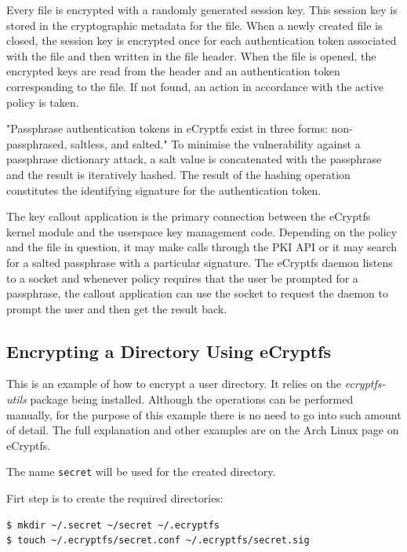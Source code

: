 Every file is encrypted with a randomly generated session key. This session key is stored in the cryptographic metadata for the file. When a newly created file is closed, the session key is encrypted once for each authentication token associated with the file and then written in the file header. When the file is opened, the encrypted keys are read from the header and an authentication token corresponding to the file. If not found, an action in accordance with the active policy is taken.

"Passphrase authentication tokens in eCryptfs exist in three forms: non-passphrased, saltless, and salted\cite{ecryptfs-paper}." To minimise the vulnerability against a passphrase dictionary attack, a salt value is concatenated with the passphrase and the result is iteratively hashed. The result of the hashing operation constitutes the identifying signature for the authentication token.

The key callout application is the primary connection between the eCryptfs kernel module and the userspace key management code. Depending on the policy and the file in question, it may make calls through the PKI API or it may search for a salted passphrase with a particular signature. The eCryptfs daemon listens to a socket and whenever policy requires that the user be prompted for a passphrase, the callout application can use the socket to request the daemon to prompt the user and then get the result back.

\subsection{Encrypting a Directory Using eCryptfs}
\label{sub-sec:encrypt-dir-ecryptfs}

This is an example of how to encrypt a user directory. It relies on the \textit{ecryptfs-utils} package being installed. Although the operations can be performed manually, for the purpose of this example there is no need to go into such amount of detail. The full explanation and other examples are on the Arch Linux page on eCryptfs\cite{ecryptfs}.

The name \texttt{secret} will be used for the created directory.

Firt step is to create the required directories:
\begin{lstlisting}[numbers=none]
$ mkdir ~/.secret ~/secret ~/.ecryptfs
$ touch ~/.ecryptfs/secret.conf ~/.ecryptfs/secret.sig
\end{lstlisting}

